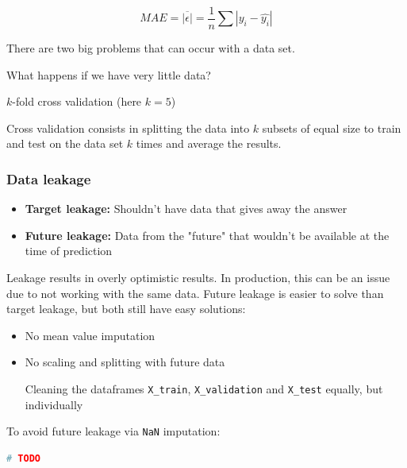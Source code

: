 $$
	MAE = \overline{|\epsilon|} = \frac{1}{n}\sum|y_i - \hat{y_i}|
$$


\par
There are two big problems that can occur with a data set.


\par
What happens if we have very little data?

$k$-fold cross validation (here $k=5$)


\par
Cross validation consists in splitting the data into $k$ subsets of equal
size to train and test on the data set $k$ times and average the results.



\subsubsection{Data leakage}
\par


\begin{itemize}
	\item \textbf{Target leakage:} Shouldn't have data that gives away the answer
	\item \textbf{Future leakage:} Data from the "future" that wouldn't be
	      available at the time of prediction
\end{itemize}

\par
Leakage results in overly optimistic results. In production, this can be an
issue due to not working with the same data. Future leakage is easier to solve
than target leakage, but both still have easy solutions:

\begin{itemize}
	\item No mean value imputation
	\item No scaling and splitting with future data
	      \par Cleaning  the dataframes \texttt{X\_train}, \texttt{X\_validation} and
	      \texttt{X\_test} equally, but individually
\end{itemize}

\par
To avoid future leakage via \texttt{NaN} imputation:

\begin{lstlisting}[language=Python]
# TODO
\end{lstlisting}

